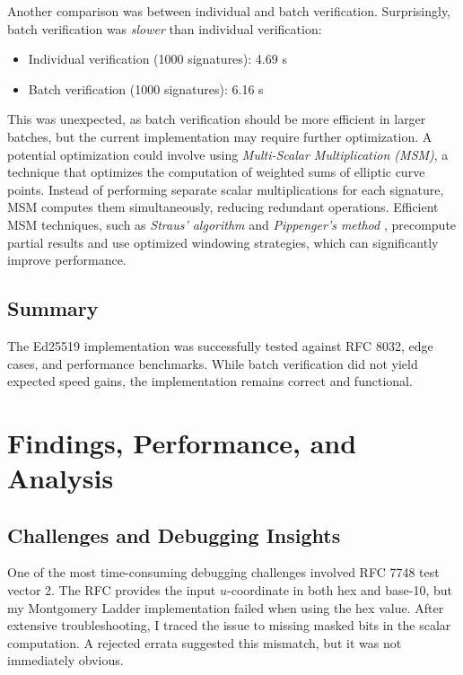 \documentclass[twoside,a4paper,12pt]{article}
\begin{document}
Another comparison was between individual and batch verification. Surprisingly, batch verification was \textit{slower} than individual verification:
\begin{itemize}
    \item Individual verification (1000 signatures): 4.69 s
    \item {Batch verification (1000 signatures)}: 6.16 s
\end{itemize}
This was unexpected, as batch verification should be more efficient in larger batches, but the current implementation may require further optimization. A potential optimization could involve using \textit{Multi-Scalar Multiplication (MSM)}, a technique that optimizes the computation of weighted sums of elliptic curve points. Instead of performing separate scalar multiplications for each signature, MSM computes them simultaneously, reducing redundant operations. Efficient MSM techniques, such as \textit{Straus' algorithm} \cite{Straus1964} and \textit{Pippenger's method} \cite{pip}, precompute partial results and use optimized windowing strategies, which can significantly improve performance.

\subsection{Summary}
The Ed25519 implementation was successfully tested against RFC 8032, edge cases, and performance benchmarks. While batch verification did not yield expected speed gains, the implementation remains correct and functional.

\section{Findings, Performance, and Analysis}
\label{sec:analysis}

\subsection{Challenges and Debugging Insights}
\label{subsec:insights_debug}
One of the most time-consuming debugging challenges involved RFC 7748 test vector 2. The RFC provides the input \( u \)-coordinate in both hex and base-10, but my Montgomery Ladder implementation failed when using the hex value. After extensive troubleshooting, I traced the issue to missing masked bits in the scalar computation. A rejected errata suggested this mismatch, but it was not immediately obvious.
\end{document}
